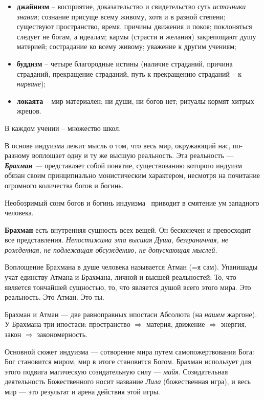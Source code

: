 \begin{itemize}
\item \textbf{джайнизм} – восприятие, доказательство и свидетельство суть \textit{источники знания}; сознание присуще всему
живому, хотя и в разной степени; существуют пространство, время, причины движения и покоя; поклоняться следует не
богам, а идеалам; кармы (страсти и желания) закрепощают душу материей; сострадание ко всему живому; уважение к другим
учениям;
\item \textbf{буддизм} – четыре благородные истины (наличие страданий, причина страданий, прекращение страданий, путь к
прекращению страданий – к \textit{нирване});
\item \textbf{локаята} – мир материален; ни души, ни богов нет; ритуалы кормят хитрых жрецов.
\end{itemize}
В каждом учении – множество школ.

В основе индуизма лежит мысль о том, что весь мир, окружающий нас, по-разному воплощает одну и ту же высшую реальность.
Эта реальность — \textbf{\textit{Брахман}}\textit{ —} представляет собой понятие, существованию которого индуизм обязан
своим принципиально монистическим характером, несмотря на почитание огромного количества богов и богинь.


Необозримый сонм богов и богинь индуизма \ приводит в смятение ум западного человека.

\textbf{Брахман} есть внутренняя сущность всех вещей. Он бесконечен и превосходит все представления.
\textit{\flqq Непостижима эта высшая Душа, безграничная, не рожденная, не подлежащая обсуждению, не допускающая мыслей\frqq.}

Воплощение Брахмана в душе человека называется Атман (=я сам). Упанишады учат единству Атмана и Брахмана, личной и
высшей реальностей: \flqq То, что является тончайшей сущностью, то, что является душой всего этого мира. Это
реальность. Это Атман. Это ты\frqq.

Брахман и Атман — две равноправных ипостаси Абсолюта (на \textit{нашем} жаргоне). У Брахмана три ипостаси: пространство
$\Rightarrow$ материя, движение $\Rightarrow$ энергия, закон $\Rightarrow$ закономерность.

Основной сюжет индуизма — сотворение мира путем самопожертвования Бога: Бог становится миром, мир в итоге становится
Богом. Брахман использует для этого подвига магическую созидательную силу — \textit{майя}. Созидательная деятельность
Божественного носит название \textit{Лила} (божественная игра), и весь мир — это результат и арена действия этой игры.


